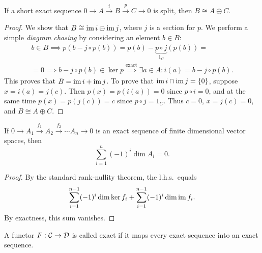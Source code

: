 \begin{prop}
    If a short exact sequence $0\to A\overset i\to B\overset p \to C\to 0$ is split, then $B\cong A\oplus C$.
\end{prop}
\begin{proof}
    We show that $B\cong \operatorname{im} i\oplus \operatorname{im} j$, where $j$ is a section for $p$. We perform a simple \emph{diagram chasing} by considering an element $b\in B$:
    \begin{multline}
        b\in B\implies p(b-j\circ p(b))=p(b)-\underbrace{p\circ j}_{1_C}(p(b))=\\=0\implies b-j\circ p(b)\in\ker p\overset{\text{exact}}{\implies}\exists a\in A: i(a)=b-j\circ p(b).
    \end{multline}
    This proves that $B=\operatorname{im} i+\operatorname{im} j$. To prove that $\operatorname{im} i\cap \operatorname{im} j=\{0\}$, suppose $x=i(a)=j(c)$. Then $p(x)=p(i(a))=0$ since $p\circ i=0$, and at the same time $p(x)=p(j(c))=c$ since $p\circ j=1_C$. Thus $c=0$, $x=j(c)=0$, and $B\cong A\oplus C$.
\end{proof}

\begin{prop}\label{gen rank-nullity}
    If $0\to A_1\overset{f_1}\to A_2 \overset{f_2}\to\cdots A_n\to 0$ is an exact sequence of finite dimensional vector spaces, then
    \[\sum_{i=1}^n(-1)^i \dim A_i=0.\]
\end{prop}
\begin{proof}
    By the standard rank-nullity theorem, the l.h.s.\ equals \[\sum_{i=1}^{n-1}(-1)^i\dim \ker f_i+\sum_{i=1}^{n-1}(-1)^i\dim \operatorname{im} f_i.\] By exactness, this sum vanishes.
\end{proof}

\begin{defn}
 A functor $F:\mathcal{C}\to\mathcal{D}$ is called exact if it maps every exact sequence into an exact sequence.
\end{defn}

